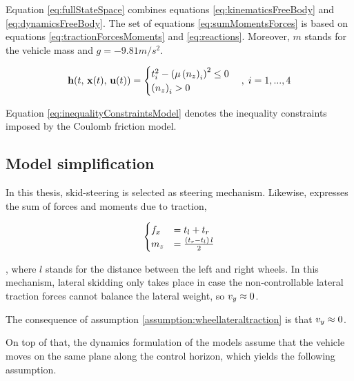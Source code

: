 Equation \eqref{eq:fullStateSpace} combines equations \eqref{eq:kinematicsFreeBody} and \eqref{eq:dynamicsFreeBody}. The set of equations \eqref{eq:sumMomentsForces} is based on equations \eqref{eq:tractionForcesMoments} and
\eqref{eq:reactions}. Moreover, $m$ stands for the vehicle mass and $g=-9.81 m/s^2$.

\begin{equation}
	\mathbf{h}(t, \,\mathbf{x}(t),\, \mathbf{u}(t)) = \begin{cases}
		t_i^2 - \left( \mu \left(n_z\right)_i \right)^2 \leq 0\\
		\left(n_z\right)_i > 0
	\end{cases}, \; i = 1, ..., 4
	\label{eq:inequalityConstraintsModel}
\end{equation}

Equation \eqref{eq:inequalityConstraintsModel} denotes the inequality constraints imposed by the Coulomb friction model.

\subsection{Model simplification}

In this thesis, skid-steering is selected as steering mechanism. Likewise,  expresses the sum of forces and moments due to traction,

\begin{equation}
\begin{cases}
f_x &= t_l + t_r\\
m_z &= \frac{\left( t_r - t_l \right) \, l}{2}
\end{cases}
\label{eq:sumForces}
\end{equation}

\noindent, where $l$ stands for the distance between the left and right wheels. In this mechanism, lateral skidding only takes place in case the non-controllable lateral traction forces cannot balance the lateral weight, so $v_y \approx 0$.

\begin{assumption}
The consequence of assumption \ref{assumption:wheellateraltraction} is that $v_y \approx 0$.
\label{eq:lateralskid}
\end{assumption}

On top of that, the dynamics formulation of the models assume that the vehicle moves on the same plane along the control horizon, which yields the following assumption.

